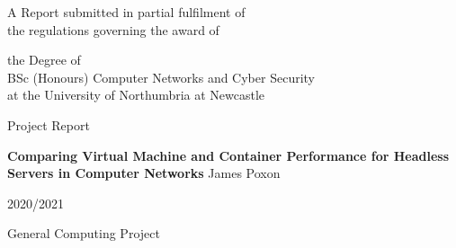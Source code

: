
\begin{titlepage}
\Large
A Report submitted in partial fulfilment of\\
 the regulations governing the award of
\par
the Degree of\\[5mm]
{\huge	 BSc (Honours) Computer Networks and Cyber Security }\\[5mm]
at the University of Northumbria at Newcastle
\par
\vspace*{1in}
{\Large Project Report}
\par\vspace{1em}
{\Huge \bfseries Comparing Virtual Machine and Container Performance for Headless Servers in Computer Networks}
\vfill
James Poxon
\par\vspace{1em}
2020/2021
\par\vspace{1em}
General Computing Project
\end{titlepage}
